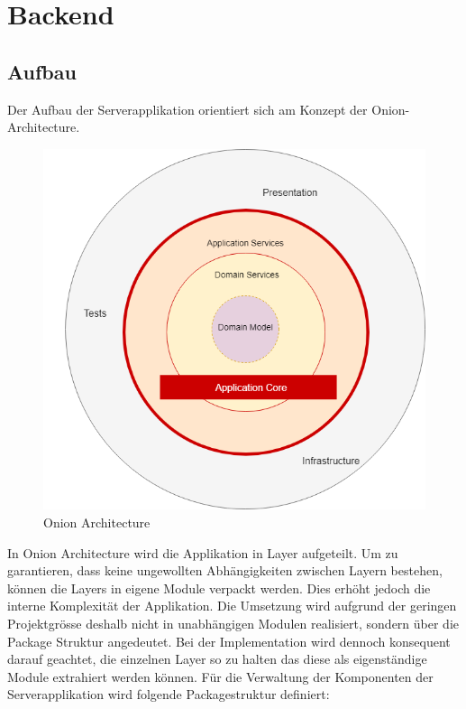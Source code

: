 \section{Backend}

\subsection{Aufbau}

Der Aufbau der Serverapplikation orientiert sich am Konzept der Onion-Architecture.

\begin{figure}[h]
    \centering
    \begin{minipage}[b]{0.4\textwidth}
        \includegraphics[width=\textwidth]{graphics/thinktocode-onion}
        \caption{Onion Architecture}
    \end{minipage}
\end{figure}

In Onion Architecture wird die Applikation in Layer aufgeteilt.
Um zu garantieren, dass keine ungewollten Abhängigkeiten zwischen Layern bestehen, können die Layers in eigene Module verpackt werden.
Dies erhöht jedoch die interne Komplexität der Applikation.
Die Umsetzung wird aufgrund der geringen Projektgrösse deshalb nicht in unabhängigen Modulen realisiert, sondern über die Package Struktur angedeutet.
Bei der Implementation wird dennoch konsequent darauf geachtet, die einzelnen Layer so zu halten das diese als eigenständige Module extrahiert werden können.
Für die Verwaltung der Komponenten der Serverapplikation wird folgende Packagestruktur definiert:

